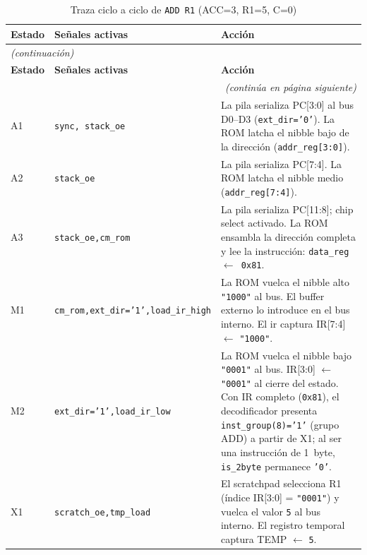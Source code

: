 \documentclass[%
    school=etsisi,%
    type=pfg,%
    degree=61CI,%
]{upm-report}
\begin{document}
\begin{longtable}{@{}p{1.2cm}p{4.2cm}p{\dimexpr\linewidth-5.4cm-4\tabcolsep\relax}@{}}
\caption{Traza ciclo a ciclo de \texttt{ADD R1} (ACC=3, R1=5, C=0)}
\label{tab:traza-add}\\
\toprule
\textbf{Estado} & \textbf{Señales activas} & \textbf{Acción}\\
\midrule
\endfirsthead
\multicolumn{3}{l}{\small\itshape(continuación)}\\
\toprule
\textbf{Estado} & \textbf{Señales activas} & \textbf{Acción}\\
\midrule
\endhead
\midrule
\multicolumn{3}{r}{\small\itshape(continúa en página siguiente)}\\
\endfoot
\bottomrule
\endlastfoot
A1 & \texttt{sync, stack\_oe} &
    La pila serializa PC[3:0] al bus D0--D3 (\texttt{ext\_dir='0'}).
    La ROM latcha el nibble bajo de la dirección
    (\texttt{addr\_reg[3:0]}). \\
\addlinespace
A2 & \texttt{stack\_oe} &
    La pila serializa PC[7:4].
    La ROM latcha el nibble medio (\texttt{addr\_reg[7:4]}). \\
\addlinespace
A3 & \texttt{stack\_oe,}\newline\texttt{cm\_rom} &
    La pila serializa PC[11:8]; chip select activado.
    La ROM ensambla la dirección completa y lee la instrucción:
    \texttt{data\_reg $\leftarrow$ 0x81}. \\
\addlinespace
M1 & \texttt{cm\_rom,}\newline\texttt{ext\_dir='1',}\newline\texttt{load\_ir\_high} &
    La ROM vuelca el nibble alto \texttt{"1000"} al bus.
    El buffer externo lo introduce en el bus interno.
    El \acrshort{ir} captura IR[7:4] $\leftarrow$ \texttt{"1000"}. \\
\addlinespace
M2 & \texttt{ext\_dir='1',}\newline\texttt{load\_ir\_low} &
    La ROM vuelca el nibble bajo \texttt{"0001"} al bus.
    IR[3:0] $\leftarrow$ \texttt{"0001"} al cierre del estado.
    Con IR completo (\texttt{0x81}), el decodificador presenta
    \texttt{inst\_group(8)='1'} (grupo ADD) a partir de X1;
    al ser una instrucción de 1~byte, \texttt{is\_2byte} permanece
    \texttt{'0'}. \\
\addlinespace
X1 & \texttt{scratch\_oe,}\newline\texttt{tmp\_load} &
    El scratchpad selecciona R1 (índice IR[3:0] = \texttt{"0001"})
    y vuelca el valor \texttt{5} al bus interno.
    El registro temporal captura TEMP $\leftarrow$ \texttt{5}. \\

\end{longtable}
\end{document}
